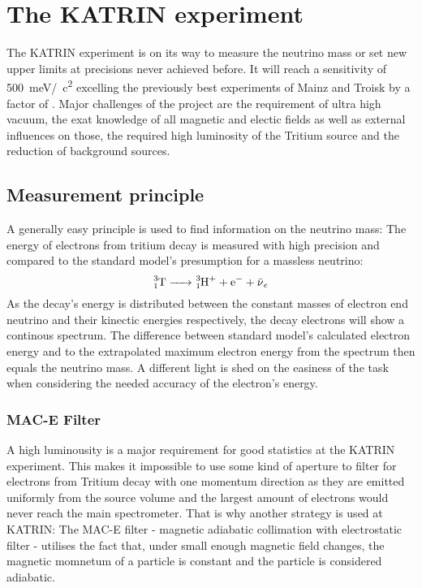 %

    \chapter{The KATRIN experiment}
    \label{ch:The KATRIN experiment}
    The KATRIN experiment is on its way to measure the neutrino mass or set new upper limits at precisions never achieved before. It will reach a sensitivity of \SI{500}{\milli\electronvolt}/\SI{}{\square c} excelling the previously best experiments of Mainz and Troisk by a factor of . Major challenges of the project are the requirement of ultra high vacuum, the exat knowledge of all magnetic and electic fields as well as external influences on those, the required high luminosity of the Tritium source and the reduction of background sources.
      \section{Measurement principle}
      \label{ch:The KATRIN experiment:sec:Measurement Principle}
      A generally easy principle is used to find information on the neutrino mass: The energy of electrons from tritium decay is measured with high precision and compared to the standard model's presumption for a massless neutrino: 
      \begin{equation}
      	\ce{^3_1T -> ^3_1H^+ + e^- + \bar{\nu}_e}
      \end{equation}
      As the decay's energy is distributed between the constant masses of electron end neutrino and their kinectic energies respectively, the decay electrons will show a continous spectrum. The difference between standard model's calculated electron energy and to the extrapolated maximum electron energy from the spectrum then equals the neutrino mass.
      A different light is shed on the easiness of the task when considering the needed accuracy of the electron's energy.
      \subsection{MAC-E Filter}
      \label{ch:The KATRIN experiment:sec:MAC-E}
      A high luminousity is a major requirement for good statistics at the KATRIN experiment. This makes it impossible to use some kind of aperture to filter for electrons from Tritium decay with one momentum direction as they are emitted uniformly from the source volume and the largest amount of electrons would never reach the main spectrometer. That is why another strategy is used at KATRIN: The MAC-E filter - magnetic adiabatic collimation with electrostatic filter - utilises the fact that, under small enough magnetic field changes, the magnetic momnetum of a particle is constant and the particle is considered adiabatic. 
